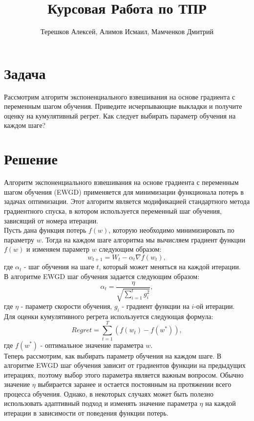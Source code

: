 \documentclass{article}
\title{Курсовая Работа по ТПР}
\author{Терешков Алексей, Алимов Исмаил, Мамченков Дмитрий}
\date{}
\begin{document}
\maketitle

\section{Задача}
Рассмотрим алгоритм экспоненциального взвешивания на основе градиента с переменным шагом обучения. Приведите исчерпывающие выкладки и получите оценку на кумулятивный регрет. Как следует выбирать параметр обучения на каждом шаге?

\section{Решение}
Алгоритм экспоненциального взвешивания на основе градиента с переменным шагом обучения (EWGD) применяется для минимизации функционала потерь в задачах оптимизации. Этот алгоритм является модификацией стандартного метода градиентного спуска, в котором используется переменный шаг обучения, зависящий от номера итерации. \\

Пусть дана функция потерь $f(w)$, которую необходимо минимизировать по параметру $w$. Тогда на каждом шаге алгоритма мы вычисляем градиент функции $f(w)$ и изменяем параметр $w$ следующим образом: \\
\[w_{t+1}=W_t-\alpha _t\nabla f(w_t),\]
где $\alpha _t$ - шаг обучения на шаге $t$, который может меняться на каждой итерации. \\

В алгоритме EWGD шаг обучения задается следующим образом:
\[\alpha _t = \frac{\eta}{\sqrt{\sum ^t_{i=1}g^2_i}},\]
где $\eta$ - параметр скорости обучения, $g_i$ - градиент функции на $i$-ой итерации. \\

Для оценки кумулятивного регрета используется следующая формула:
\[Regret = \sum^T_{t=1}(f(w_t)-f(w^*)),\]
где $f(w^*)$ - оптимальное значение параметра $w$. \\

Теперь рассмотрим, как выбирать параметр обучения на каждом шаге. В алгоритме EWGD шаг обучения зависит от градиентов функции на предыдущих итерациях, поэтому выбор этого параметра является важным вопросом. Обычно значение $\eta$ выбирается заранее и остается постоянным на протяжении всего процесса обучения. Однако, в некоторых случаях может быть полезно использовать адаптивный подход и изменять значение параметра $\eta$ на каждой итерации в зависимости от поведения функции потерь. \\
\end{document}
